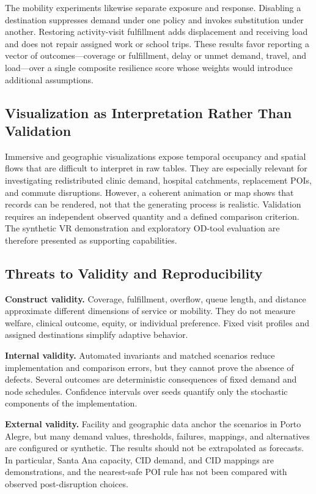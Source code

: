 \documentclass[pdflatex,sn-mathphys-num]{sn-jnl}%
\theoremstyle{thmstyleone}%
\theoremstyle{thmstyletwo}%
\theoremstyle{thmstylethree}%
\begin{document}
The mobility experiments likewise separate exposure and response. Disabling a destination suppresses demand under one policy and invokes substitution under another. Restoring activity-visit fulfillment adds displacement and receiving load and does not repair assigned work or school trips. These results favor reporting a vector of outcomes---coverage or fulfillment, delay or unmet demand, travel, and load---over a single composite resilience score whose weights would introduce additional assumptions.

\subsection{Visualization as Interpretation Rather Than Validation}

Immersive and geographic visualizations expose temporal occupancy and spatial flows that are difficult to interpret in raw tables. They are especially relevant for investigating redistributed clinic demand, hospital catchments, replacement POIs, and commute disruptions. However, a coherent animation or map shows that records can be rendered, not that the generating process is realistic. Validation requires an independent observed quantity and a defined comparison criterion. The synthetic VR demonstration and exploratory OD-tool evaluation are therefore presented as supporting capabilities.

\subsection{Threats to Validity and Reproducibility}
\label{discussion:validity}

\textbf{Construct validity.} Coverage, fulfillment, overflow, queue length, and distance approximate different dimensions of service or mobility. They do not measure welfare, clinical outcome, equity, or individual preference. Fixed visit profiles and assigned destinations simplify adaptive behavior.

\textbf{Internal validity.} Automated invariants and matched scenarios reduce implementation and comparison errors, but they cannot prove the absence of defects. Several outcomes are deterministic consequences of fixed demand and node schedules. Confidence intervals over seeds quantify only the stochastic components of the implementation.

\textbf{External validity.} Facility and geographic data anchor the scenarios in Porto Alegre, but many demand values, thresholds, failures, mappings, and alternatives are configured or synthetic. The results should not be extrapolated as forecasts. In particular, Santa Ana capacity, CID demand, and CID mappings are demonstrations, and the nearest-safe POI rule has not been compared with observed post-disruption choices.
\end{document}
